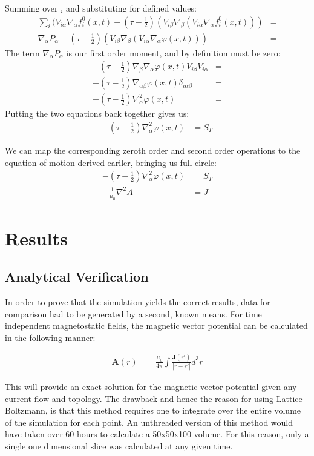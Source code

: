 \documentclass[12pt,a4paper]{article}
\begin{document}
Summing over $_i$ and substituting for defined values:
\begin{align}
\sum_i (V_{i\alpha} \nabla_\alpha f_i^0(x,t) - (\tau - \frac{1}{2}) (V_{i\beta} \nabla_\beta (V_{i\alpha} \nabla_\alpha f_i^0(x,t)))&= \\
\nabla_\alpha P_\alpha - (\tau - \frac{1}{2})(V_{i\beta} \nabla_\beta (V_{i\alpha} \nabla_\alpha \varphi(x,t)))&=
\end{align}
The term $\nabla_\alpha P_\alpha$ is our first order moment, and by definition must be zero:
\begin{align}
-(\tau - \frac{1}{2}) \nabla_\beta \nabla_\alpha \varphi(x,t) V_{i\beta} V_{i\alpha} &=\\
-(\tau - \frac{1}{2}) \nabla_{\alpha\beta} \varphi(x,t) \delta_{i\alpha\beta} &= \\
-(\tau - \frac{1}{2}) \nabla_{\alpha}^2 \varphi(x,t) &= 
\end{align}
Putting the two equations back together gives us:
\begin{align}
-(\tau - \frac{1}{2}) \nabla_{\alpha}^2 \varphi(x,t) &=  S_T
\end{align}

We can map the corresponding zeroth order and second order operations to the equation of motion derived eariler, bringing us full circle:
\begin{align}
-(\tau - \frac{1}{2}) \nabla_{\alpha}^2 \varphi(x,t) &=  S_T \\
-\frac{1}{\mu_0} \nabla^2A &= J
\end{align}

\section{Results}
\subsection{Analytical Verification}
In order to prove that the simulation yields the correct results, data for comparison had to be generated by a second, known means. For time independent magnetostatic fields, the magnetic vector potential can be calculated in the following manner:

\begin{align}
\textbf{A}(r) &= \frac{\mu_0}{4\pi} \int \frac{\textbf{J}(r')}{|r-r'|} d^3r 
\end{align}

This will provide an exact solution for the magnetic vector potential given any current flow and topology. The drawback and hence the reason for using Lattice Boltzmann, is that this method requires one to integrate over the entire volume of the simulation for each point. An unthreaded version of this method would have taken over 60 hours to calculate a 50x50x100 volume. For this reason, only a single one dimensional slice was calculated at any given time.
\end{document}
